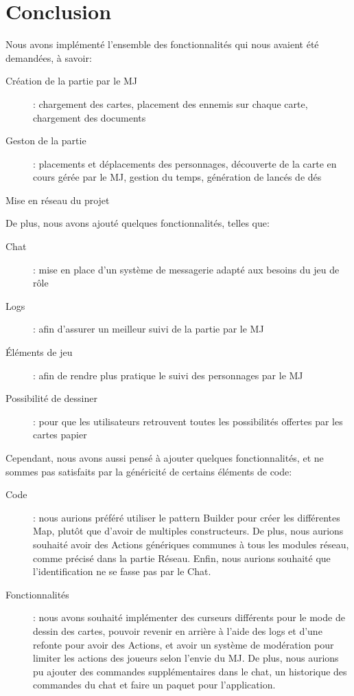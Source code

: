 \section{Conclusion}

Nous avons implémenté l'ensemble des fonctionnalités qui nous avaient été demandées, à savoir:
\begin{description}
	\item[Création de la partie par le MJ]: chargement des cartes, placement des ennemis sur chaque carte, chargement des documents
	\item[Geston de la partie]: placements et déplacements des personnages, découverte de la carte en cours gérée par le MJ, gestion du temps, génération de lancés de dés
	\item[Mise en réseau du projet]
\end{description}
\hfill

De plus, nous avons ajouté quelques fonctionnalités, telles que:
\begin{description}
	\item[Chat]: mise en place d'un système de messagerie adapté aux besoins du jeu de rôle
	\item[Logs]: afin d'assurer un meilleur suivi de la partie par le MJ
	\item[Éléments de jeu]: afin de rendre plus pratique le suivi des personnages par le MJ
	\item[Possibilité de dessiner]: pour que les utilisateurs retrouvent toutes les possibilités offertes par les cartes papier
\end{description}
\hfill

Cependant, nous avons aussi pensé à ajouter quelques fonctionnalités, et ne sommes pas satisfaits par la généricité de certains éléments de code:
\begin{description}
	\item[Code]: nous aurions préféré utiliser le pattern Builder pour créer les différentes Map, plutôt que d'avoir de multiples constructeurs. De plus, nous aurions souhaité avoir des Actions génériques communes à tous les modules réseau, comme précisé dans la partie Réseau. Enfin, nous aurions souhaité que l'identification ne se fasse pas par le Chat.
	\item[Fonctionnalités]: nous avons souhaité implémenter des curseurs différents pour le mode de dessin des cartes, pouvoir revenir en arrière à l'aide des logs et d'une refonte pour avoir des Actions, et avoir un système de modération pour limiter les actions des joueurs selon l'envie du MJ. De plus, nous aurions pu ajouter des commandes supplémentaires dans le chat, un historique des commandes du chat et faire un paquet pour l'application.
\end{description}